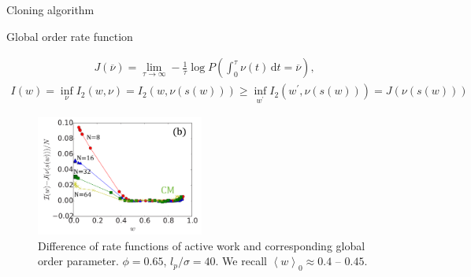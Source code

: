 \documentclass{beamer}
\begin{document}
{\begin{frame}[noframenumbering]{Cloning algorithm}
\end{frame}

\begin{frame}[noframenumbering]{Global order rate function}

\vspace{-10pt}
\begin{align*}
  J(\overline{\nu}) = \lim_{\tau \rightarrow \infty} - \frac{1}{\tau} \log P\left(\int_0^{\tau} \nu(t) \, \text{d}t = \overline{\nu}\right),
\end{align*}
\begin{align*}
  I(w) = \inf_{\nu} I_2(w, \nu) = I_2(w, \nu(s(w))) \geq \inf_{w^{\prime}} I_2(w^{\prime}, \nu(s(w))) = J(\nu(s(w)))
\end{align*}

\begin{figure}
\centering
\includegraphics[width=0.49\textwidth]{Nemoto_2019_fig2b.png}
\caption{Difference of rate functions of active work and corresponding global order parameter. $\phi = 0.65$, $l_p/\sigma = 40$. We recall $\left<w\right>_0 \approx 0.4$ -- $0.45$. }
\end{figure}

\end{frame}

}
\end{document}
